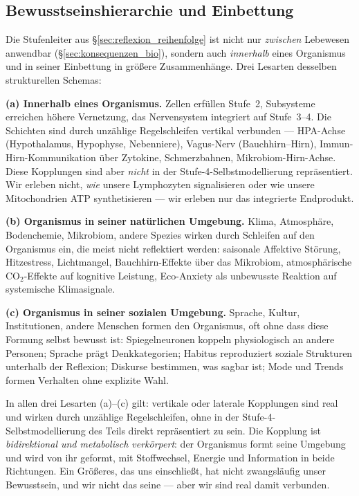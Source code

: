 \subsection{Bewusstseinshierarchie und Einbettung}\label{sec:konsequenzen_einbettung}

Die Stufenleiter aus \S\ref{sec:reflexion_reihenfolge} ist nicht nur \emph{zwischen} Lebewesen anwendbar (\S\ref{sec:konsequenzen_bio}), sondern auch \emph{innerhalb} eines Organismus und in seiner Einbettung in größere Zusammenhänge. Drei Lesarten desselben strukturellen Schemas:

\textbf{(a) Innerhalb eines Organismus.} Zellen erfüllen Stufe~2, Subsysteme erreichen höhere Vernetzung, das Nervensystem integriert auf Stufe~3--4. Die Schichten sind durch unzählige Regelschleifen vertikal verbunden --- HPA-Achse (Hypothalamus, Hypophyse, Nebenniere), Vagus-Nerv (Bauchhirn--Hirn), Immun-Hirn-Kommunikation über Zytokine, Schmerzbahnen, Mikrobiom-Hirn-Achse. Diese Kopplungen sind aber \emph{nicht} in der Stufe-4-Selbstmodellierung repräsentiert. Wir erleben nicht, \emph{wie} unsere Lymphozyten signalisieren oder wie unsere Mitochondrien ATP synthetisieren --- wir erleben nur das integrierte Endprodukt.

\textbf{(b) Organismus in seiner natürlichen Umgebung.} Klima, Atmosphäre, Bodenchemie, Mikrobiom, andere Spezies wirken durch Schleifen auf den Organismus ein, die meist nicht reflektiert werden: saisonale Affektive Störung, Hitzestress, Lichtmangel, Bauchhirn-Effekte über das Mikrobiom, atmosphärische CO$_2$-Effekte auf kognitive Leistung, Eco-Anxiety als unbewusste Reaktion auf systemische Klimasignale.

\textbf{(c) Organismus in seiner sozialen Umgebung.} Sprache, Kultur, Institutionen, andere Menschen formen den Organismus, oft ohne dass diese Formung selbst bewusst ist: Spiegelneuronen koppeln physiologisch an andere Personen; Sprache prägt Denkkategorien; Habitus reproduziert soziale Strukturen unterhalb der Reflexion; Diskurse bestimmen, was sagbar ist; Mode und Trends formen Verhalten ohne explizite Wahl.

\begin{important}
In allen drei Lesarten (a)--(c) gilt: vertikale oder laterale Kopplungen sind real und wirken durch unzählige Regelschleifen, ohne in der Stufe-4-Selbstmodellierung des Teils direkt repräsentiert zu sein. Die Kopplung ist \emph{bidirektional und metabolisch verkörpert}: der Organismus formt seine Umgebung und wird von ihr geformt, mit Stoffwechsel, Energie und Information in beide Richtungen. Ein Größeres, das uns einschließt, hat nicht zwangsläufig unser Bewusstsein, und wir nicht das seine --- aber wir sind real damit verbunden.
\end{important}

